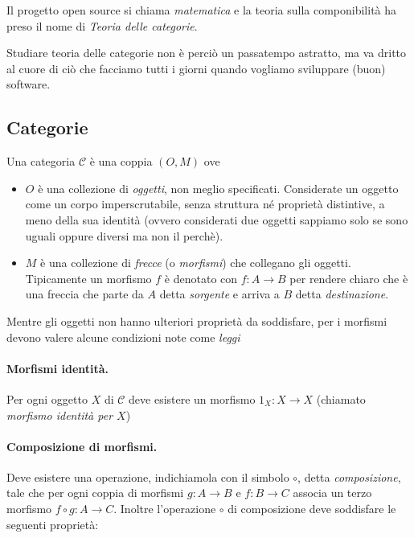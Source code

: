 \documentclass[12pt]{article}
\begin{document}
Il progetto open source si chiama \emph{matematica} e la teoria sulla componibilità ha preso il nome di \emph{Teoria delle categorie}.

Studiare teoria delle categorie non è perciò un passatempo astratto, ma va dritto al cuore di ciò che facciamo tutti i giorni quando vogliamo
sviluppare (buon) software.

\subsection{Categorie}

Una categoria $\mathcal{C}$ è una coppia $(O, M)$ ove
\begin{itemize}
  \item $O$ è una collezione di \emph{oggetti}, non meglio specificati. Considerate un oggetto come un corpo imperscrutabile,
  senza struttura né proprietà distintive, a meno della sua identità (ovvero considerati due oggetti sappiamo solo se sono uguali oppure diversi
  ma non il perchè).
  \item $M$ è una collezione di \emph{frecce} (o \emph{morfismi}) che collegano gli oggetti. Tipicamente un morfismo $f$ è denotato con $f: A \rightarrow B$
  per rendere chiaro che è una freccia che parte da $A$ detta \emph{sorgente} e arriva a $B$ detta \emph{destinazione}.
\end{itemize}

Mentre gli oggetti non hanno ulteriori proprietà da soddisfare, per i morfismi devono valere alcune condizioni note come \emph{leggi}\\

\paragraph{Morfismi identità.} Per ogni oggetto $X$ di $\mathcal{C}$ deve esistere un morfismo $1_X: X \rightarrow X$ (chiamato \emph{morfismo identità per $X$})\\

\paragraph{Composizione di morfismi.} Deve esistere una operazione, indichiamola con il simbolo $\circ$, detta \emph{composizione}, tale che per ogni coppia di morfismi $g: A \rightarrow B$
e $f: B \rightarrow C$ associa un terzo morfismo $f \circ g: A \rightarrow C$. Inoltre l'operazione $\circ$ di composizione deve soddisfare le seguenti proprietà:
\end{document}
